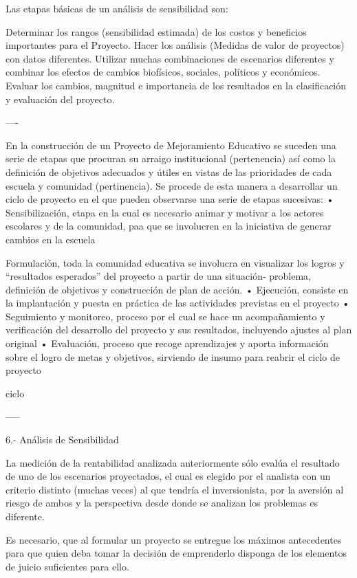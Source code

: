 Las etapas básicas de un análisis de sensibilidad son:

Determinar los rangos (sensibilidad estimada) de los costos y beneficios importantes para el Proyecto.
Hacer los análisis (Medidas de valor de proyectos) con datos diferentes.
Utilizar muchas combinaciones de escenarios diferentes y combinar los efectos de cambios biofísicos, sociales, políticos y económicos.
Evaluar los cambios, magnitud e importancia de los resultados en la clasificación y evaluación del proyecto.


----

En la construcción de un Proyecto de Mejoramiento Educativo se suceden una serie de etapas que procuran su arraigo institucional (pertenencia) así como la definición de objetivos adecuados y útiles en vistas de las prioridades de cada escuela y comunidad (pertinencia). Se procede de esta manera a desarrollar un ciclo de proyecto en el que pueden observarse una serie de etapas sucesivas: • Sensibilización, etapa en la cual es necesario animar y motivar a los actores escolares y de la comunidad, paa que se involucren en la iniciativa de generar cambios en la escuela


Formulación, toda la comunidad educativa se involucra en visualizar los logros y “resultados esperados” del proyecto a partir de una situación- problema, definición de objetivos y construcción de plan de acción. • Ejecución, consiste en la implantación y puesta en práctica de las actividades previstas en el proyecto • Seguimiento y monitoreo, proceso por el cual se hace un acompañamiento y verificación del desarrollo del proyecto y sus resultados, incluyendo ajustes al plan original • Evaluación, proceso que recoge aprendizajes y aporta información sobre el logro de metas y objetivos, sirviendo de insumo para reabrir el ciclo de proyecto


ciclo



-----


6.- Análisis de Sensibilidad

La medición de la rentabilidad analizada anteriormente sólo evalúa el resultado de uno de los escenarios proyectados, el cual es elegido por el analista con un criterio distinto (muchas veces) al que tendría el inversionista, por la aversión al riesgo de ambos y la perspectiva desde donde se analizan los problemas es diferente.

Es necesario, que al formular un proyecto se entregue los máximos antecedentes para que quien deba tomar la decisión de emprenderlo disponga de los elementos de juicio suficientes para ello.

